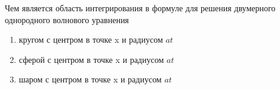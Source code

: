 Чем является область интегрирования в формуле для решения двумерного однородного волнового уравнения

\begin{enumerate}[label=\arabic*)]
    \item кругом с центром в точке x и радиусом \(at\)
    \item сферой с центром в точке x и радиусом \(at\)
    \item шаром с центром в точке x и радиусом \(at\)
\end{enumerate}

